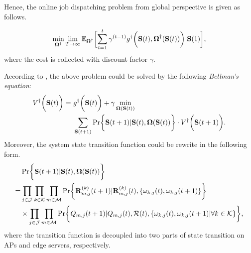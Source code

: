 Hence, the online job dispatching problem from global perspective is given as follows.
\begin{problem}
    \begin{align}
        \min_{\Policy^{\dagger}} \lim_{T \to \infty}
            \mathbb{E}_{\Policy^{\dagger}}
                \Bracket{\sum_{t=1}^t \gamma^{(t-1)} g^{\dagger}\Paren{\Stat(t), \Policy^{\dagger}(\Stat(t))}|\Stat(1)},
    \end{align}
    where the cost is collected with discount factor $\gamma$.
\end{problem}
According to \cite{sutton1998introduction}, the above problem could be solved by the following \emph{Bellman's equation}:
\begin{align}
    V^{\dagger}\Paren{\Stat(t)} =~&g^{\dagger}\Paren{\Stat(t)} + \gamma \min_{\Policy(\Stat(t))}
        \nonumber\\
        &\sum_{\Stat(t+1)} \Pr\Brace{ \Stat(t+1)|\Stat(t), \Policy(\Stat(t)) } \cdot V^{\dagger}\Paren{\Stat(t+1)}.
    \label{eqn:sp_0}
\end{align}
Moreover, the system state transition function could be rewrite in the following form.
\begin{align}
    & \Pr\Brace{ \Stat(t+1)|\Stat(t), \Policy(\Stat(t)) }
    \nonumber\\
    =& \prod_{j\in\jSpace}\prod_{k\in\apSet}\prod_{m\in\esSet}
            \Pr\Brace{
                \vec{R}^{(k)}_{m,j}(t+1) | \vec{R}^{(k)}_{m,j}(t),
                \set{\omega_{k,j}(t), \omega_{k,j}(t+1)}
            }  
        \nonumber\\
        & \times \prod_{j\in\jSpace}\prod_{m\in\esSet}
            \Pr\Brace{
                Q_{m,j}(t+1)|Q_{m,j}(t), \mathcal{R}(t),
                \set{\omega_{k,j}(t), \omega_{k,j}(t+1)|\forall k\in\apSet}
            },
\end{align}
where the transition function is decoupled into two parts of state transition on APs and edge servers, respectively.

